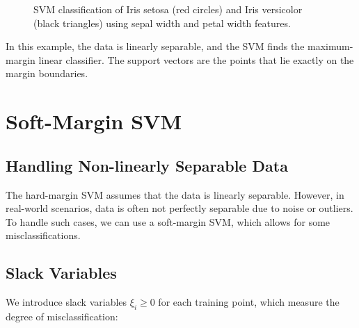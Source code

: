 \documentclass{article}
\begin{document}
\begin{figure}[h]
\centering
{}
\caption{SVM classification of Iris setosa (red circles) and Iris versicolor (black triangles) using sepal width and petal width features.}
\end{figure}

In this example, the data is linearly separable, and the SVM finds the maximum-margin linear classifier. The support vectors are the points that lie exactly on the margin boundaries.

\section{Soft-Margin SVM}

\subsection{Handling Non-linearly Separable Data}
The hard-margin SVM assumes that the data is linearly separable. However, in real-world scenarios, data is often not perfectly separable due to noise or outliers. To handle such cases, we can use a soft-margin SVM, which allows for some misclassifications.

\subsection{Slack Variables}
We introduce slack variables $\xi_i \geq 0$ for each training point, which measure the degree of misclassification:
\end{document}
